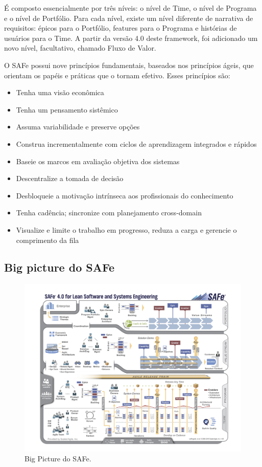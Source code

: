 É composto essencialmente por três níveis: o nível de Time, o nível de Programa e o nível de Portfólio. Para cada nível, existe um nível diferente de narrativa de requisitos: épicos para o Portfólio, features para o Programa e histórias de usuários para o Time. A partir da versão 4.0 deste framework, foi adicionado um novo nível, facultativo, chamado Fluxo de Valor.

O SAFe possui nove princípios fundamentais, baseados nos princípios ágeis, que orientam os papéis e práticas que o tornam efetivo. Esses princípios são:
\begin{itemize}
\item Tenha uma visão econômica
\item Tenha um pensamento sistêmico
\item Assuma variabilidade e preserve opções
\item Construa incrementalmente com ciclos de aprendizagem integrados e rápidos
\item Baseie os marcos em avaliação objetiva dos sistemas 	
\item Descentralize a tomada de decisão
\item Desbloqueie a motivação intrínseca aos profissionais do conhecimento
\item Tenha cadência; sincronize com planejamento cross-domain
\item Visualize e limite o trabalho em progresso, reduza a carga e gerencie o comprimento da fila
\end{itemize}
\subsection{Big picture do SAFe}
  \begin{figure}[!htbp]
    \centering
    \includegraphics[scale=0.35]{editaveis/figuras/SAFe_big_picture}
    \caption[Big Picture do SAFe]{Big Picture do SAFe. \footnotemark}
    \label{big-picture-safe}
  \end{figure}
  \newpage

